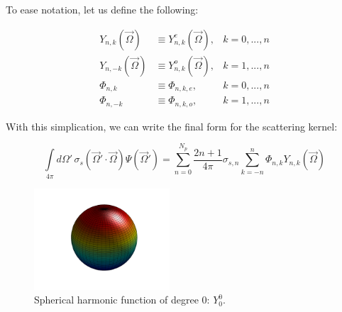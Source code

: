 \noindent To ease notation, let us define the following:

\begin{equation}
\label{eq::App_SN_sharm_flux_ease}
\begin{aligned}
Y_{n,k} (\vec{\Omega}) &\equiv Y_{n,k}^e (\vec{\Omega}), & k=0,...,n\\
Y_{n,-k} (\vec{\Omega}) &\equiv Y_{n,k}^o (\vec{\Omega}), & k=1,...,n\\
\Phi_{n,k} &\equiv \Phi_{n,k,e}, & k=0,...,n\\ 
\Phi_{n,-k} &\equiv\Phi_{n,k,o}, & k=1,...,n
\end{aligned} 
\end{equation}

\noindent With this simplication, we can write the final form for the scattering kernel:

\begin{equation}
\label{eq::App_SN_scatt_kernel_FINAL}
\int\limits_{4 \pi} d \Omega' \, \sigma_s (\vec{\Omega}' \cdot \vec{\Omega}) \Psi (\vec{\Omega}')  = \sum_{n=0}^{N_p} \frac{2n+1}{4 \pi}\sigma_{s,n} \sum_{k=-n}^{n} \Phi_{n,k} Y_{n,k} (\vec{\Omega})
\end{equation}


\iffalse
\pagebreak

\begin{figure}
\label{fig::Sn_Y0}
\centering
\includegraphics[width=0.45\textwidth]{figures/appendices/Y_0_0.png}
\caption{Spherical harmonic function of degree 0: $Y_{0}^{0}$.}
\end{figure}

